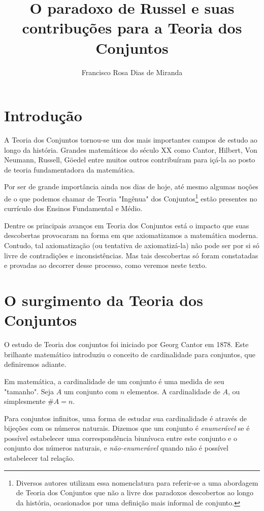 \documentclass[a4paper,10pt]{article}
\title{O paradoxo de Russel e suas contribuções para a Teoria dos Conjuntos}
\author{Francisco Rosa Dias de Miranda}
\begin{document}
\maketitle

\section{Introdução}

A Teoria dos Conjuntos tornou-se um dos mais importantes campos de estudo ao longo da história. Grandes matemáticos do século XX como Cantor, Hilbert, Von Neumann, Russell, Göedel entre muitos outros contribuíram para içá-la ao posto de teoria fundamentadora da matemática.\cite{rpm04}

Por ser de grande importância ainda nos dias de hoje, até mesmo algumas noções de o que podemos chamar de Teoria "Ingênua" dos Conjuntos\footnote{Diversos autores utilizam essa nomenclatura para referir-se a uma abordagem de Teoria dos Conjuntos que não a livre dos paradoxos descobertos ao longo da história, ocasionados por uma definição mais informal de conjunto.} estão presentes no currículo dos Ensinos Fundamental e Médio. 

Dentre os principais avanços em Teoria dos Conjuntos está o impacto que suas descobertas provocaram na forma em que axiomatizamos a matemática moderna. Contudo, tal axiomatização (ou tentativa de axiomatizá-la) não pode ser por si só livre de contradições e inconsistências. Mas tais descobertas só foram constatadas e provadas ao decorrer desse processo, como veremos neste texto. 

\section{O surgimento da Teoria dos Conjuntos}

O estudo de Teoria dos conjuntos foi iniciado por Georg Cantor em 1878. 
Este brilhante matemático introduziu o conceito de cardinalidade para conjuntos, que definiremos adiante.

Em matemática, a cardinalidade de um conjunto é uma medida de seu "tamanho". Seja $A$ um conjunto com $n$ elementos. A cardinalidade de $A$, ou simplesmente $\#A = n$.

Para conjuntos infinitos, uma forma de estudar sua cardinalidade é através de bijeções com os números naturais. Dizemos que um conjunto é \emph{enumerável} se é possível estabelecer uma correspondência biunívoca entre este conjunto e o conjunto dos números naturais, e \emph{não-enumerável} quando não é possível estabelecer tal relação.
\end{document}
